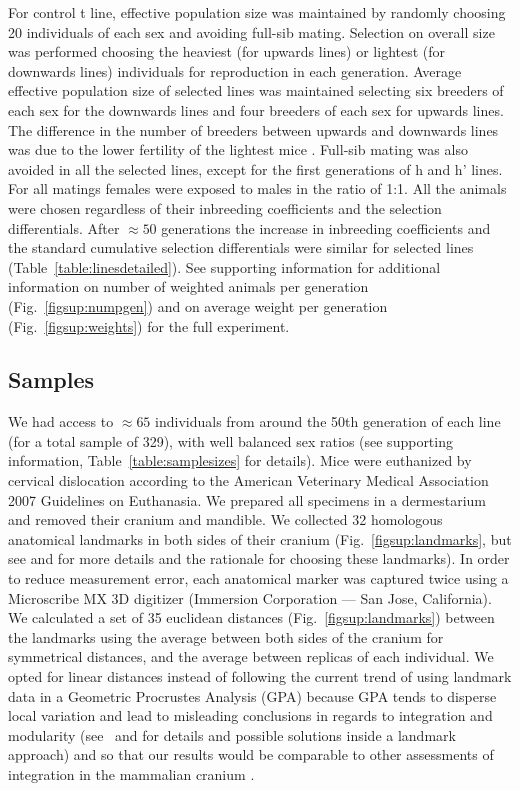 \begin{refsection}
For control t line, effective population size was maintained by randomly
choosing 20 individuals of each sex and avoiding full-sib mating.
Selection on overall size was performed choosing the heaviest (for
upwards lines) or lightest (for downwards lines) individuals for
reproduction in each generation. Average effective population size of
selected lines was maintained selecting six breeders of each sex for the
downwards lines and four breeders of each sex for upwards lines. The
difference in the number of breeders between upwards and downwards lines
was due to the lower fertility of the lightest mice \parencite{Bernardi2009-kv}.
Full-sib mating was also avoided in all the selected lines, except for
the first generations of h and h' lines. For all matings females were
exposed to males in the ratio of 1:1. All the animals were chosen
regardless of their inbreeding coefficients and the selection
differentials. After \(\approx 50\) generations the increase in
inbreeding coefficients and the standard cumulative selection
differentials were similar for selected lines (Table~\ref{table:linesdetailed}). See supporting
information for additional information on number of weighted animals per
generation (Fig.~\ref{figsup:numpgen}) and on average weight per generation (Fig.~\ref{figsup:weights}) for
the full experiment.

\subsection{Samples}

We had access to \(\approx 65\) individuals from around the 50th
generation of each line (for a total sample of 329), with well balanced
sex ratios (see supporting information, Table~\ref{table:samplesizes} for details). Mice were
euthanized by cervical dislocation according to the American Veterinary
Medical Association 2007 Guidelines on Euthanasia. We prepared all
specimens in a dermestarium and removed their cranium and mandible. We
collected 32 homologous anatomical landmarks in both sides of their
cranium (Fig.~\ref{figsup:landmarks}, but see \textcite{Cheverud1995-fd} and \textcite{Garcia2014-oj} for more
details and the rationale for choosing these landmarks). In order to
reduce measurement error, each anatomical marker was captured twice
using a Microscribe MX 3D digitizer (Immersion Corporation --- San Jose,
California). We calculated a set of 35 euclidean distances (Fig.~\ref{figsup:landmarks})
between the landmarks using the average between both sides of the
cranium for symmetrical distances, and the average between replicas of
each individual. We opted for linear distances instead of following the
current trend of using landmark data in a Geometric Procrustes Analysis
(GPA) because GPA tends to disperse local variation and lead to
misleading conclusions in regards to integration and modularity
(see~\textcite{Van_der_Linde2009-yx} and \textcite{Marquez2012-qe} for details and possible
solutions inside a landmark approach) and so that our results would be
comparable to other assessments of integration in the mammalian cranium
\parencite{Porto2009-pi, Porto2013-dc}.


\end{refsection}

